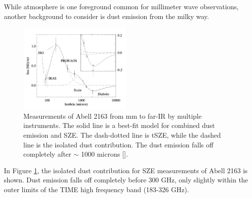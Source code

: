 \documentclass[manuscript]{aastex}
\begin{document}
While atmosphere is one foreground common for millimeter wave observations, another background to consider is dust emission from the milky way. 
\begin{figure}
\vspace{-0.8cm}
  \begin{center}
    \includegraphics[width=0.5\textwidth]{birkinshaw1.png}
   \end{center}
\caption[TIME's frequency window will be mostly free of dust emission contamination. -(\cite{Birkinshaw1999})]{Measurements of Abell 2163 from mm to far-IR by multiple instruments. The solid line is a best-fit model for combined dust emission and SZE. The dash-dotted line is tSZE, while the dashed line is the isolated dust contribution. The dust emission falls off completely after $\sim$ 1000 microns [\cite{Birkinshaw1999}].}
\label{fig:dust}
\end{figure}
In Figure \ref{fig:dust}, the isolated dust contribution for SZE measurements of Abell 2163 is shown. Dust emission falls off completely before 300 GHz, only slightly within the outer limits of the TIME high frequency band (183-326 GHz). 
\end{document}
